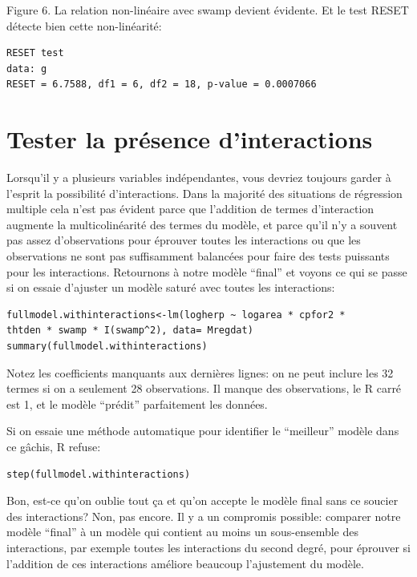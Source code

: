 \documentclass[12pt,]{book}
\begin{document}
Figure 6.
La relation non-linéaire avec swamp devient évidente. Et le test RESET détecte bien cette non-linéarité:

\begin{verbatim}
RESET test
data: g
RESET = 6.7588, df1 = 6, df2 = 18, p-value = 0.0007066
\end{verbatim}

\hypertarget{tester-la-pruxe9sence-dinteractions}{%
\section{Tester la présence d'interactions}\label{tester-la-pruxe9sence-dinteractions}}

Lorsqu'il y a plusieurs variables indépendantes, vous devriez toujours garder à l'esprit la possibilité d'interactions. Dans la majorité des situations de régression multiple cela n'est pas évident parce que l'addition de termes d'interaction augmente la multicolinéarité des termes du modèle, et parce qu'il n'y a souvent pas assez d'observations pour éprouver toutes les interactions ou que les observations ne sont pas suffisamment balancées pour faire des tests puissants pour les interactions. Retournons à notre modèle ``final'' et voyons ce qui se passe si on essaie d'ajuster un modèle saturé avec toutes les interactions:

\begin{verbatim}
fullmodel.withinteractions<-lm(logherp ~ logarea * cpfor2 *
thtden * swamp * I(swamp^2), data= Mregdat)
summary(fullmodel.withinteractions)
\end{verbatim}

Notez les coefficients manquants aux dernières lignes: on ne peut inclure les 32 termes si on a seulement 28 observations. Il manque des observations, le R carré est 1, et le modèle ``prédit'' parfaitement les données.

Si on essaie une méthode automatique pour identifier le ``meilleur'' modèle dans ce gâchis, R refuse:

\begin{verbatim}
step(fullmodel.withinteractions)
\end{verbatim}

Bon, est-ce qu'on oublie tout ça et qu'on accepte le modèle final sans ce soucier des interactions? Non, pas encore. Il y a un compromis possible: comparer notre modèle ``final'' à un modèle qui contient au moins un sous-ensemble des interactions, par exemple toutes les interactions du second degré, pour éprouver si l'addition de ces interactions améliore beaucoup l'ajustement du modèle.
\end{document}
